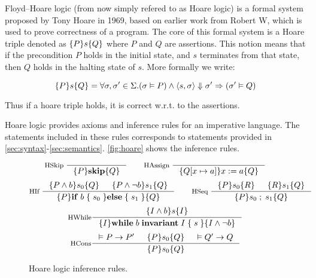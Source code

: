Floyd–Hoare logic (from now simply refered to as Hoare logic) is a formal system proposed by Tony Hoare in 1969,
based on earlier work from Robert W, which is used to prove correctness of a program.
The core of this formal system is a Hoare triple denoted as $\{P\}s\{Q\}$
where $P$ and $Q$ are assertions.
This notion means that if the precondition $P$ holds in the initial state,
and $s$ terminates from that state, then $Q$ holds in the halting state of $s$. More formally we write:

$$\{P\}s\{Q\} = \forall \sigma, \sigma' \in \Sigma. (\sigma \vDash P) \wedge \langle s, \sigma \rangle \Downarrow \sigma' \Rightarrow (\sigma' \vDash Q)$$

Thus if a hoare triple holds, it is correct w.r.t. to the assertions.

Hoare logic provides axioms and inference rules for an imperative language.
The statements included in these rules corresponds to statements provided in \ref{sec:syntax}-\ref{sec:semantics}. \autoref{fig:hoare} shows the inference rules.

\begin{figure}[h!]
\begin{equation*}
\inference[HSkip ]{}
{\hoarePQ{\mathbf{skip}}}
\qquad
\inference[HAssign ]{}
{\hoare{Q[x \mapsto a]}{x := a}{Q}}
\end{equation*}
\begin{equation*}
\inference[HIf ]{\hoare{P \wedge b}{s_0}{Q} & \hoare{P \wedge \neg b}{s_1}{Q}}
{\hoarePQ{ \mathbf{if} \; b \; \{ \; s_0 \; \} \mathbf{else} \; \{ \; s_1 \; \} }}
\qquad
\inference[HSeq ]{\hoare{P}{s_0}{R} & \hoare{R}{s_1}{Q}}
{\hoarePQ{s_0 \; ; \; s_1}}
\end{equation*}
\begin{equation*}
\inference[HWhile]{\hoare{I \wedge b}{s}{I}}
{\hoare{I}{ \mathbf{while} \; b \; \mathbf{invariant} \; I \; \{ \; s \; \} }{I \wedge \neg b}}
\end{equation*}
\begin{equation*}
\inference[HCons]{\vDash P \rightarrow P' & \hoare{P}{s_0}{Q} & \vDash Q' \rightarrow Q}
{\hoarePQ{s_0}}
\end{equation*}
\caption{Hoare logic inference rules.}
\label{fig:hoare}
\end{figure}


